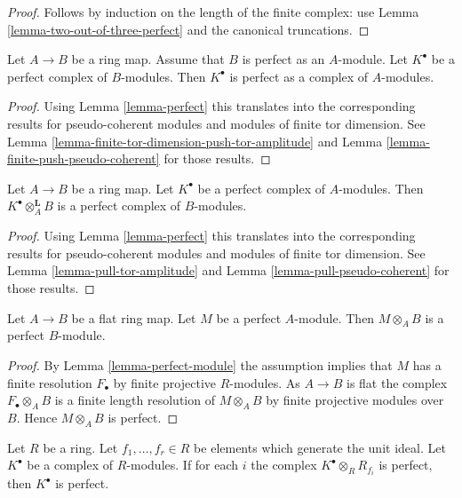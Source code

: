 \begin{proof}
Follows by induction on the length of the finite complex: use
Lemma \ref{lemma-two-out-of-three-perfect}
and the canonical truncations.
\end{proof}

\begin{lemma}
\label{lemma-perfect-push-perfect}
Let $A \to B$ be a ring map. Assume that $B$ is perfect as
an $A$-module. Let $K^\bullet$ be a perfect complex of $B$-modules.
Then $K^\bullet$ is perfect as a complex of $A$-modules.
\end{lemma}

\begin{proof}
Using
Lemma \ref{lemma-perfect}
this translates into the corresponding results for pseudo-coherent modules
and modules of finite tor dimension. See
Lemma \ref{lemma-finite-tor-dimension-push-tor-amplitude}
and
Lemma \ref{lemma-finite-push-pseudo-coherent}
for those results.
\end{proof}

\begin{lemma}
\label{lemma-pull-perfect}
Let $A \to B$ be a ring map.
Let $K^\bullet$ be a perfect
complex of $A$-modules. Then $K^\bullet \otimes_A^{\mathbf{L}} B$
is a perfect complex of $B$-modules.
\end{lemma}

\begin{proof}
Using
Lemma \ref{lemma-perfect}
this translates into the corresponding results for pseudo-coherent modules
and modules of finite tor dimension. See
Lemma \ref{lemma-pull-tor-amplitude}
and
Lemma \ref{lemma-pull-pseudo-coherent}
for those results.
\end{proof}

\begin{lemma}
\label{lemma-flat-base-change-perfect}
Let $A \to B$ be a flat ring map. Let $M$ be a perfect $A$-module.
Then $M \otimes_A B$ is a perfect $B$-module.
\end{lemma}

\begin{proof}
By
Lemma \ref{lemma-perfect-module}
the assumption implies that $M$ has a finite resolution $F_\bullet$ by
finite projective $R$-modules. As $A \to B$ is flat the complex
$F_\bullet \otimes_A B$ is a finite length resolution of $M \otimes_A B$
by finite projective modules over $B$. Hence $M \otimes_A B$ is perfect.
\end{proof}

\begin{lemma}
\label{lemma-glue-perfect}
Let $R$ be a ring. Let $f_1, \ldots, f_r \in R$ be elements which
generate the unit ideal. Let $K^\bullet$
be a complex of $R$-modules. If for each $i$ the complex
$K^\bullet \otimes_R R_{f_i}$ is perfect,
then $K^\bullet$ is perfect.
\end{lemma}

